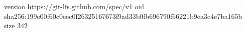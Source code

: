 version https://git-lfs.github.com/spec/v1
oid sha256:199e00f60c0eec0f26325167673f9ad33b0fb696790f66221b9ea3c4e7ba165b
size 342
